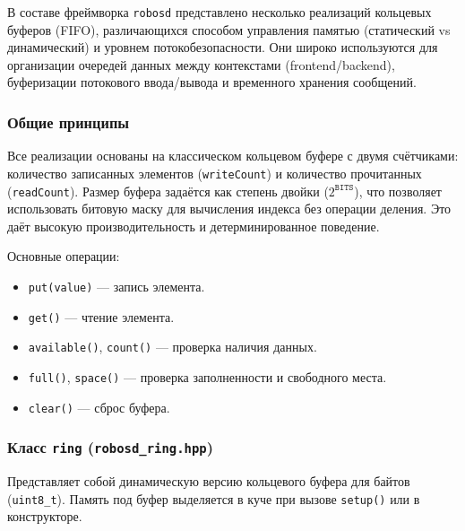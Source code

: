 \documentclass[a4paper,12pt]{article}
\begin{document}
В составе фреймворка \texttt{robosd} представлено несколько реализаций кольцевых буферов (FIFO), различающихся способом управления памятью (статический vs динамический) и уровнем потокобезопасности. Они широко используются для организации очередей данных между контекстами (frontend/backend), буферизации потокового ввода/вывода и временного хранения сообщений.

\subsubsection{Общие принципы}

Все реализации основаны на классическом кольцевом буфере с двумя счётчиками: количество записанных элементов (\texttt{writeCount}) и количество прочитанных (\texttt{readCount}). Размер буфера задаётся как степень двойки ($2^{\texttt{BITS}}$), что позволяет использовать битовую маску для вычисления индекса без операции деления. Это даёт высокую производительность и детерминированное поведение.

Основные операции:
\begin{itemize}
    \item \texttt{put(value)} — запись элемента.
    \item \texttt{get()} — чтение элемента.
    \item \texttt{available()}, \texttt{count()} — проверка наличия данных.
    \item \texttt{full()}, \texttt{space()} — проверка заполненности и свободного места.
    \item \texttt{clear()} — сброс буфера.
\end{itemize}

\subsubsection{Класс \texttt{ring} (\texttt{robosd\_ring.hpp})}

Представляет собой динамическую версию кольцевого буфера для байтов (\texttt{uint8\_t}). Память под буфер выделяется в куче при вызове \texttt{setup()} или в конструкторе.
\end{document}
